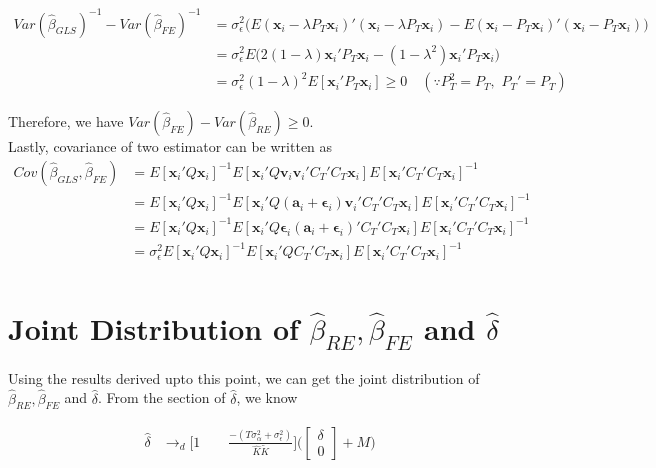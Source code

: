 \documentclass[12pt]{article}
\begin{document}
\begin{align*}
Var(\widehat{\beta}_{GLS})^{-1} - Var(\widehat{\beta}_{FE})^{-1} & = \sigma_\epsilon^2 \big( E(\mathbf{x}_i - \lambda P_T \mathbf{x}_i)' (\mathbf{x}_i - \lambda P_T \mathbf{x}_i) - E(\mathbf{x}_i - P_T\mathbf{x}_i)'(\mathbf{x}_i - P_T \mathbf{x}_i)  \big)\\
&= \sigma_\epsilon^2 E\big( 2(1-\lambda) \mathbf{x}_i'P_T \mathbf{x}_i - (1-\lambda^2) \mathbf{x}_i' P_T \mathbf{x}_i  \big) \\
&= \sigma_\epsilon^2 (1-\lambda)^2 E[\mathbf{x}_i' P_T \mathbf{x}_i] \geq 0 \quad (\because P_T^2 = P_T,\,\, P_T' = P_T)
\end{align*}

Therefore, we have $Var(\widehat{\beta}_{FE}) - Var(\widehat{\beta}_{RE}) \geq 0$. \\

Lastly, covariance of two estimator can be written as
\begin{align*}
Cov(\widehat{\beta}_{GLS}, \widehat{\beta}_{FE}) &= E[\mathbf{x}_i' Q \mathbf{x}_i]^{-1} E[\mathbf{x}_i' Q \mathbf{v}_i \mathbf{v}_i' C_T' C_T \mathbf{x}_i] E[\mathbf{x}_i' C_T'C_T \mathbf{x}_i]^{-1}\\
& = E[\mathbf{x}_i' Q \mathbf{x}_i]^{-1} E[\mathbf{x}_i' Q (\mathbf{a}_i + \mathbf{\epsilon}_i)\mathbf{v}_i' C_T' C_T \mathbf{x}_i] E[\mathbf{x}_i' C_T'C_T \mathbf{x}_i]^{-1}\\
& = E[\mathbf{x}_i' Q \mathbf{x}_i]^{-1} E[\mathbf{x}_i' Q  \mathbf{\epsilon}_i(\mathbf{a}_i+\mathbf{\epsilon}_i)' C_T' C_T \mathbf{x}_i] E[\mathbf{x}_i' C_T'C_T \mathbf{x}_i]^{-1}\\
& = \sigma_\epsilon^2 E[\mathbf{x}_i' Q \mathbf{x}_i]^{-1} E[\mathbf{x}_i' Q  C_T' C_T \mathbf{x}_i] E[\mathbf{x}_i' C_T'C_T \mathbf{x}_i]^{-1}\\
\end{align*}



\section*{Joint Distribution of $\widehat{\beta}_{RE}, \widehat{\beta}_{FE}$ and $\widehat{\delta}$}

Using the results derived upto this point, we can get the joint distribution of $\widehat{\beta}_{RE}, \widehat{\beta}_{FE}$ and $\widehat{\delta}$. From the section of $\widehat{\delta}$, we know

\begin{align*}
\widehat{\delta} & \rightarrow_d \bigg [1 \qquad \frac{-(T\sigma_\alpha^2 +\sigma_\epsilon^2)}{\widehat{K} \widetilde{K}} \bigg ]  \bigg( \begin{bmatrix}
\delta \\
0  
\end{bmatrix} + M\bigg)
\end{align*}
\end{document}
